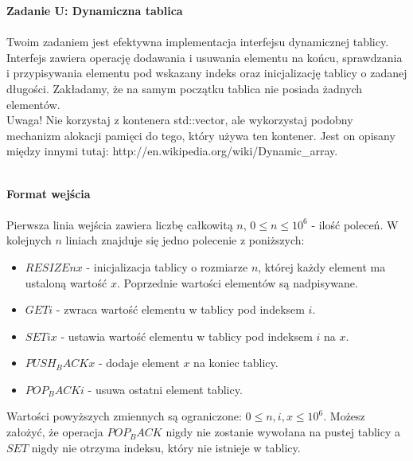 \documentclass[
  fontsize=12pt  %
 ,english        %
 ,headinclude    %
 ,headsepline    %
]{scrbook}       %
\begin{document}
\vspace{50 mm}
\hspace{50 mm}
\newline

\par{\Large \textbf{Zadanie U: Dynamiczna tablica}} \\ \\
Twoim zadaniem jest efektywna implementacja interfejsu dynamicznej tablicy. Interfejs zawiera operację dodawania i usuwania elementu na końcu, sprawdzania i przypisywania elementu pod wskazany indeks oraz inicjalizację tablicy o zadanej długości. Zakładamy, że na samym początku tablica nie posiada żadnych elementów.
\\
Uwaga! Nie korzystaj z kontenera std::vector, ale wykorzystaj podobny mechanizm alokacji pamięci do tego, który używa ten kontener. Jest on opisany między innymi tutaj: http://en.wikipedia.org/wiki/Dynamic_array.
\\ \\
\par{\Large \textbf{Format wejścia}} \\ \\
Pierwsza linia wejścia zawiera liczbę całkowitą $n$, $0 \leq n \leq 10^6$ - ilość poleceń. W kolejnych $n$ liniach znajduje się jedno polecenie z poniższych:
\begin{itemize}
  \item $RESIZE n x$ - inicjalizacja tablicy o rozmiarze $n$, której każdy element ma ustaloną wartość $x$. Poprzednie wartości elementów są nadpisywane.
  \item $GET i$ - zwraca wartość elementu w tablicy pod indeksem $i$.
  \item $SET i x$ - ustawia wartość elementu w tablicy pod indeksem $i$ na $x$.
  \item $PUSH_BACK x$ - dodaje element $x$ na koniec tablicy.
  \item $POP_BACK i$ - usuwa ostatni element tablicy.
\end{itemize}

Wartości powyższych zmiennych są ograniczone: $0 \leq n, i, x \leq 10^6$. Możesz założyć, że operacja $POP_BACK$ nigdy nie zostanie wywołana na pustej tablicy a $SET$ nigdy nie otrzyma indeksu, który nie istnieje w tablicy.
\end{document}
